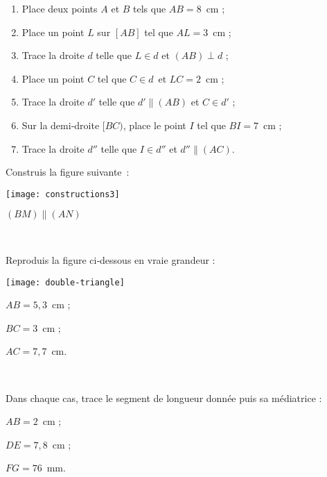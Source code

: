 \begin{exercice}
\begin{enumerate}
 \item Place deux points $A$ et $B$ tels que $AB = 8$ cm ;
 \item Place un point $L$ sur $[AB]$ tel que $AL = 3$ cm ;
 \item Trace la droite $d$ telle que $L \in d$ et $(AB) \perp d$ ;
 \item Place un point $C$ tel que $C \in d$ et $LC = 2$ cm ;
 \item Trace la droite $d'$ telle que $d' \parallel (AB)$ et $C \in d'$ ;
 \item Sur la demi‑droite $[BC)$, place le point $I$ tel que $BI = 7$ cm ;
 \item Trace la droite $d''$ telle que $I \in d''$ et $d'' \parallel (AC)$.
 \end{enumerate}
\end{exercice}


\begin{exercice}
Construis la figure suivante : \\[0.75em]
\begin{minipage}[c]{0.2\textwidth}
\texttt{[image: constructions3]}
 \end{minipage} \hfill%
 \begin{minipage}[c]{0.2\textwidth}
 $(BM) \parallel (AN)$
  \end{minipage} \\
\end{exercice}


\begin{exercice}
Reproduis la figure ci‑dessous en vraie grandeur : \\[0.75em]
\begin{minipage}[c]{0.3\textwidth}
\texttt{[image: double-triangle]}
 \end{minipage} \hfill%
 \begin{minipage}[c]{0.4\textwidth}
$AB = 5,3$ cm ;

$BC = 3$ cm ;

$AC = 7,7$ cm.
 \end{minipage} \\
\end{exercice}



\begin{exercice}[Médiatrices]
Dans chaque cas, trace le segment de longueur donnée puis sa médiatrice :
 \begin{colenumerate}{3}
  \item $AB = 2$ cm ;
  \item $DE = 7,8$ cm ;
  \item $FG = 76$ mm.
  \end{colenumerate}
\end{exercice}


